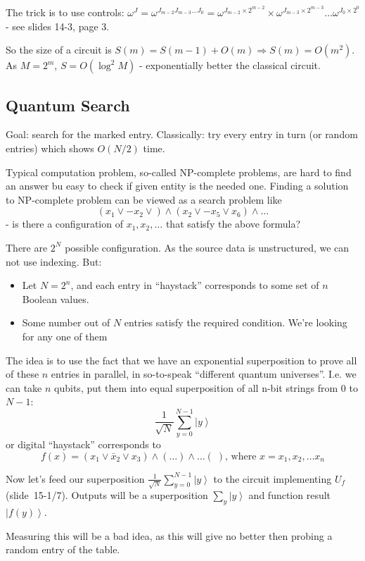 \documentclass{scrartcl}
\newcommand{\ket}[1]{\left| #1 \right>} %
\newcommand{\means}{\Rightarrow} %
\newcommand{\slide}[2]{slide~#1/#2} %
\newcommand{\video}[2]{ } %
\begin{document}
The trick is to use controls: $\omega^J = \omega^{J_{m-2}J_{m-3} \dots J_0} =
\omega^{J_{m-2} \times 2^{m-2}} \times \omega^{J_{m-3} \times 2^{m-3}} \dots
\omega^{J_0 \times 2^0}$ - see slides 14-3, page 3.

So the size of a circuit is $S(m) = S(m-1) + O(m) \means S(m) = O(m^2)$. As $M =
2^m$, $S=O(\log^2 M)$ - exponentially better the classical circuit.

\subsection{Quantum Search}
\label{sec:QuantumSearch}

Goal: search for the marked entry. Classically: try every entry in turn (or
random entries) which shows $O(N/2)$ time.

Typical computation problem, so-called NP-complete problems, are hard to find an
answer bu easy to check if given entity is the needed one. Finding a solution to
NP-complete problem can be viewed as a search problem like
$$(x_1 \vee -x_2 \vee) \wedge (x_2 \vee -x_5 \vee x_6) \wedge \dots$$
- is there a configuration of $x_1, x_2, \dots$ that satisfy the above formula?

There are $2^N$ possible configuration. As the source data is unstructured, we
can not use indexing. But:
\begin{itemize}
\item Let $N=2^n$, and each entry in ``haystack'' corresponds to some set of $n$
  Boolean values.
\item Some number out of $N$ entries satisfy the required condition. We're
  looking for any one of them
\end{itemize}
\video{15-1}{06:30} The idea is to use the fact that we have an exponential
superposition to prove all of these $n$ entries in parallel, in so-to-speak
``different quantum universes''. I.e. we can take $n$ qubits, put them into
equal superposition of all n-bit strings from 0 to $N-1$:
$$\frac1{\sqrt{N}}\sum\limits_{y=0}^{N-1} \ket y $$  
or digital ``haystack'' corresponds to
$$f(x) = (x_1 \vee \bar x_2 \vee x_3) \wedge (\dots) \wedge \dots (\;)\text{,
  where } x = x_1, x_2, \dots x_n$$

Now let's feed our superposition $\frac1{\sqrt{N}}\sum\limits_{y=0}^{N-1} \ket y
$ to the circuit implementing $U_f$ (\slide{15-1}7). Outputs will be a
superposition $\sum\limits_y \ket y$ and function result $\ket{f(y)}$.

Measuring this will be a bad idea, as this will give no better then probing a
random entry of the table.
\end{document}
